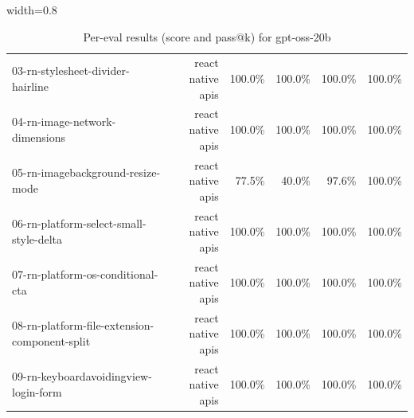 \begin{table}[htbp]
\begin{adjustbox}{width=0.8\textwidth}
\begin{tabular}{lrrrrr}
03-rn-stylesheet-divider-hairline & react native apis & 100.0\% & 100.0\% & 100.0\% & 100.0\% \\
04-rn-image-network-dimensions & react native apis & 100.0\% & 100.0\% & 100.0\% & 100.0\% \\
05-rn-imagebackground-resize-mode & react native apis & 77.5\% & 40.0\% & 97.6\% & 100.0\% \\
06-rn-platform-select-small-style-delta & react native apis & 100.0\% & 100.0\% & 100.0\% & 100.0\% \\
07-rn-platform-os-conditional-cta & react native apis & 100.0\% & 100.0\% & 100.0\% & 100.0\% \\
08-rn-platform-file-extension-component-split & react native apis & 100.0\% & 100.0\% & 100.0\% & 100.0\% \\
09-rn-keyboardavoidingview-login-form & react native apis & 100.0\% & 100.0\% & 100.0\% & 100.0\% \\
\bottomrule
\end{tabular}
\end{adjustbox}
\caption{Per-eval results (score and pass@k) for gpt-oss-20b}
\end{table}
